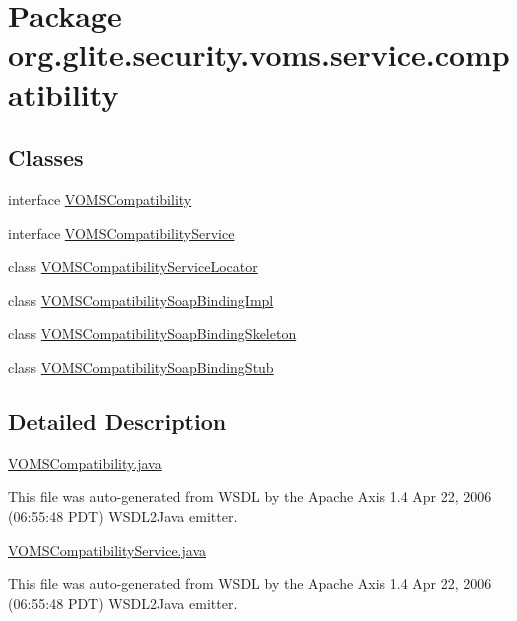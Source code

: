 \hypertarget{namespaceorg_1_1glite_1_1security_1_1voms_1_1service_1_1compatibility}{
\section{Package org.glite.security.voms.service.compatibility}
\label{namespaceorg_1_1glite_1_1security_1_1voms_1_1service_1_1compatibility}
}
\subsection*{Classes}
\begin{DoxyCompactItemize}
\item 
interface \hyperlink{interfaceorg_1_1glite_1_1security_1_1voms_1_1service_1_1compatibility_1_1VOMSCompatibility}{VOMSCompatibility}
\item 
interface \hyperlink{interfaceorg_1_1glite_1_1security_1_1voms_1_1service_1_1compatibility_1_1VOMSCompatibilityService}{VOMSCompatibilityService}
\item 
class \hyperlink{classorg_1_1glite_1_1security_1_1voms_1_1service_1_1compatibility_1_1VOMSCompatibilityServiceLocator}{VOMSCompatibilityServiceLocator}
\item 
class \hyperlink{classorg_1_1glite_1_1security_1_1voms_1_1service_1_1compatibility_1_1VOMSCompatibilitySoapBindingImpl}{VOMSCompatibilitySoapBindingImpl}
\item 
class \hyperlink{classorg_1_1glite_1_1security_1_1voms_1_1service_1_1compatibility_1_1VOMSCompatibilitySoapBindingSkeleton}{VOMSCompatibilitySoapBindingSkeleton}
\item 
class \hyperlink{classorg_1_1glite_1_1security_1_1voms_1_1service_1_1compatibility_1_1VOMSCompatibilitySoapBindingStub}{VOMSCompatibilitySoapBindingStub}
\end{DoxyCompactItemize}


\subsection{Detailed Description}
\hyperlink{VOMSCompatibility_8java}{VOMSCompatibility.java}

This file was auto-\/generated from WSDL by the Apache Axis 1.4 Apr 22, 2006 (06:55:48 PDT) WSDL2Java emitter.

\hyperlink{VOMSCompatibilityService_8java}{VOMSCompatibilityService.java}

This file was auto-\/generated from WSDL by the Apache Axis 1.4 Apr 22, 2006 (06:55:48 PDT) WSDL2Java emitter.

